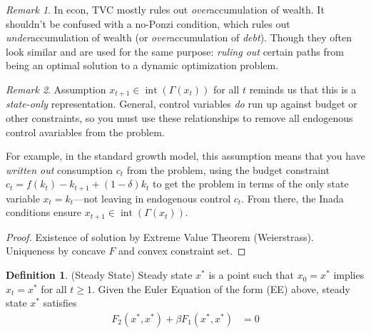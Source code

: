 \documentclass[12pt]{book}
\numberwithin{equation}{section} %
\theoremstyle{plain}
\theoremstyle{definition}
\newtheorem{defn}[thm]{Definition}
\theoremstyle{remark}
\newtheorem*{rmk}{Remark}
\newcommand{\interior}{\operatorname{int}}
\begin{document}
\begin{rmk}
In econ, TVC mostly rules out \emph{over}accumulation of wealth.
It shouldn't be confused with a no-Ponzi condition, which rules out
\emph{under}accumulation of wealth (or \emph{over}accumulation of
\emph{debt}). Though they often look similar and are used for the same
purpose: \emph{ruling out} certain paths from being an optimal solution
to a dynamic optimization problem.
\end{rmk}
\begin{rmk}
Assumption $x_{t+1}\in\interior(\Gamma(x_t))$ for all $t$
reminds us that this is a \emph{state-only} representation.
General, control variables \emph{do} run up against budget or other
constraints, so you must use these relationships to remove
all endogenous control avariables from the problem.

For example, in the standard growth model, this assumption
means that you have \emph{written out} consumption $c_t$ from the
problem, using the budget constraint $c_t = f(k_t) - k_{t+1} +
(1-\delta) k_t$ to get the problem in terms of the only state variable
$x_t=k_t$---not leaving in endogenous control $c_t$.  From there, the
Inada conditions ensure $x_{t+1}\in \interior(\Gamma(x_t))$.
\end{rmk}
\begin{proof}
Existence of solution by Extreme Value Theorem (Weierstrass). Uniqueness
by concave $F$ and convex constraint set.
\end{proof}

\begin{defn}(Steady State)
Steady state $x^*$ is a point such that $x_0=x^*$ implies $x_t=x^*$ for
all $t\geq 1$.
Given the Euler Equation of the form (EE) above, steady state $x^*$
satisfies
\begin{align*}
  F_2(x^*,x^*) + \beta F_1(x^*,x^*)
  &= 0
\end{align*}
\end{defn}
\end{document}
